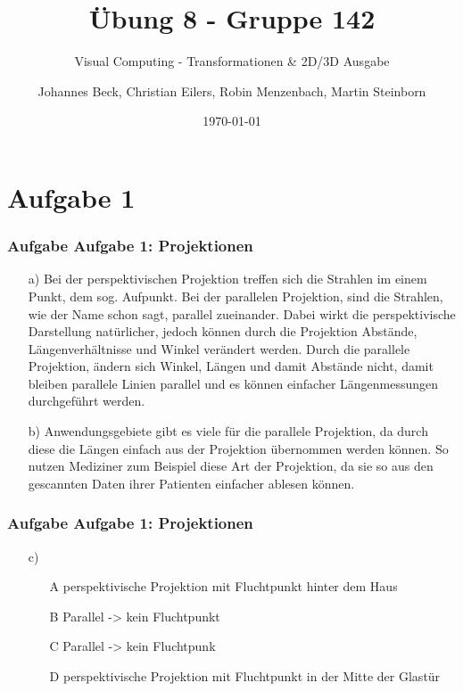 \documentclass[accentcolor=tud9c,colorbacktitle,inverttitle,landscape,german,presentation,t]{tudbeamer}
\begin{document}
	
	\title{\"Ubung 8 - Gruppe 142}
	\subtitle{Visual Computing - Transformationen \& 2D/3D Ausgabe}
	
	\author[Johannes Beck, Christian Eilers, Robin Menzenbach, Martin Steinborn]{Johannes Beck, Christian Eilers, Robin Menzenbach, Martin Steinborn}
	
	
	\date{\today}
	
	\begin{titleframe}
	\end{titleframe}
	
	\section{Aufgabe 1}
	\begin{frame}
		\frametitle{Aufgabe Aufgabe 1: Projektionen}
		\begin{itemize}
			\item[a)] Bei der perspektivischen Projektion treffen sich die Strahlen im einem Punkt, dem sog. Aufpunkt. Bei der parallelen Projektion, sind die Strahlen, wie der Name schon sagt, parallel zueinander. Dabei wirkt die perspektivische Darstellung natürlicher, jedoch können durch die Projektion Abstände, Längenverhältnisse und Winkel verändert werden. Durch die parallele Projektion, ändern sich Winkel, Längen und damit Abstände nicht, damit bleiben parallele Linien parallel und es können einfacher Längenmessungen durchgeführt werden.
			\item[b)] Anwendungsgebiete gibt es viele für die parallele Projektion, da durch diese die Längen einfach aus der Projektion übernommen werden können. So nutzen Mediziner zum Beispiel diese Art der Projektion, da sie so aus den gescannten Daten ihrer Patienten einfacher ablesen können.
		\end{itemize}
	\end{frame}
	
	\begin{frame}
		\frametitle{Aufgabe Aufgabe 1: Projektionen}
		\begin{itemize}
			\item[c)] 
			\begin{itemize}
				\item[A] perspektivische Projektion mit Fluchtpunkt hinter dem Haus
				\item[B] Parallel -> kein Fluchtpunkt
				\item[C] Parallel -> kein Fluchtpunk
				\item[D] perspektivische Projektion mit Fluchtpunkt in der Mitte der Glastür
			\end{itemize}
		\end{itemize}
	\end{frame}
	
\end{document}
